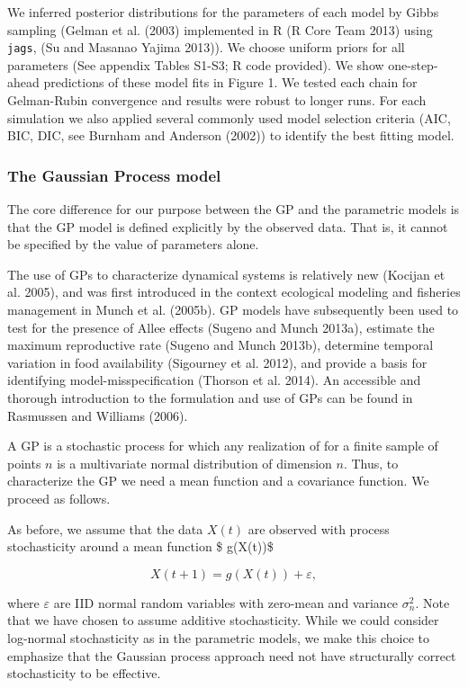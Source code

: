 \documentclass[author-year, 12pt,review]{components/elsarticle} %
\begin{document}
We inferred posterior distributions for the parameters of each model by
Gibbs sampling (Gelman et al. (2003) implemented in R (R Core Team 2013)
using \texttt{jags}, (Su and Masanao Yajima 2013)). We choose uniform
priors for all parameters (See appendix Tables S1-S3; R code provided).
We show one-step-ahead predictions of these model fits in Figure 1. We
tested each chain for Gelman-Rubin convergence and results were robust
to longer runs. For each simulation we also applied several commonly
used model selection criteria (AIC, BIC, DIC, see Burnham and Anderson
(2002)) to identify the best fitting model.

\subsubsection{The Gaussian Process
model}\label{the-gaussian-process-model}

The core difference for our purpose between the GP and the parametric
models is that the GP model is defined explicitly by the observed data.
That is, it cannot be specified by the value of parameters alone.

The use of GPs to characterize dynamical systems is relatively new
(Kocijan et al. 2005), and was first introduced in the context
ecological modeling and fisheries management in Munch et al. (2005b). GP
models have subsequently been used to test for the presence of Allee
effects (Sugeno and Munch 2013a), estimate the maximum reproductive rate
(Sugeno and Munch 2013b), determine temporal variation in food
availability (Sigourney et al. 2012), and provide a basis for
identifying model-misspecification (Thorson et al. 2014). An accessible
and thorough introduction to the formulation and use of GPs can be found
in Rasmussen and Williams (2006).

A GP is a stochastic process for which any realization of for a finite
sample of points $n$ is a multivariate normal distribution of dimension
$n$. Thus, to characterize the GP we need a mean function and a
covariance function. We proceed as follows.

As before, we assume that the data $X(t)$ are observed with process
stochasticity around a mean function \$ g(X(t))\$

\begin{equation}
X(t+1) = g(X(t)) + \varepsilon,
\end{equation}

where $\varepsilon$ are IID normal random variables with zero-mean and
variance $\sigma_n^2$. Note that we have chosen to assume additive
stochasticity. While we could consider log-normal stochasticity as in
the parametric models, we make this choice to emphasize that the
Gaussian process approach need not have structurally correct
stochasticity to be effective.
\end{document}
